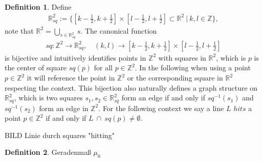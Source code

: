 \documentclass[12pt,a4paper]{scrartcl}
\numberwithin{equation}{subsection}
\newcommand{\1}{\mathbbm{1}}
\numberwithin{equation}{section}
\theoremstyle{definition}
\newtheorem{definition}{Definition}[subsection]
\begin{document}
\begin{definition}
	Define 
	\begin{align}
		\mathbb{R}^2_{sq} := \{[k - \frac{1}{2}, k + \frac{1}{2}] \times [l- \frac{1}{2}, l + \frac{1}{2}] \subset \mathbb{R}^2\ |\ k,l \in \mathbb{Z}\}, 
	\end{align} 
	note that $\mathbb{R}^2 = \bigcup_{s\in \mathbb{R}^2_{sq}} s$. The canonical function
	\begin{align}
	sq: \mathbb{Z}^2 \to \mathbb{R}^2_{sq},\quad (k,l)\to [k - \frac{1}{2}, k + \frac{1}{2}] \times [l- \frac{1}{2}, l + \frac{1}{2}]
	\end{align}
	is bijective and intuitively identifies points in $\mathbb{Z}^2$ with squares in $\mathbb{R}^2$, which is $p$ is the center of square $sq(p)$ for all $p\in \mathbb{Z}^2$. In the following when using a point $p\in \mathbb{Z}^2$ it will reference the point in $\mathbb{Z}^2$ or the corresponding square in $\mathbb{R}^2$ respecting the context. This bijection also naturally defines a graph structure on $\mathbb{R}^2_{sq}$, which is two squares $s_1, s_2\in \mathbb{R}^2_{sq}$ form an edge if and only if $sq^{-1}(s_1)$ and $sq^{-1}(s_2)$ form an edge in $\mathbb{Z}^2$. 
	\noindent For the following context we say a line $L$ $hits$ a point $p\in \mathbb{Z}^2$ if and only if $L\ \cap\ sq(p) \neq \emptyset$.
	
\end{definition}

BILD Linie durch squares "hitting"\\


\begin{definition}
	Geradenmaß $\mu_0$
\end{definition}
\end{document}
